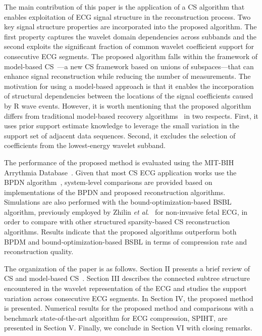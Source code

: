 \documentclass[journal]{IEEEtran}
\begin{document}
The main contribution of this paper is the application of a  CS algorithm that enables exploitation of ECG signal structure in the reconstruction process. Two key signal structure properties are incorporated into the proposed algorithm. The first property captures the wavelet domain dependencies across subbands and the second exploits the significant fraction of common wavelet coefficient support for consecutive ECG segments. The proposed algorithm falls within the framework of model-based CS~\cite{Bara10}---a new CS framework based on unions of subspaces---that can enhance signal reconstruction while reducing the number of measurements. The motivation for using a model-based approach is that it enables the incorporation of structural dependencies between the locations of the signal coefficients caused by R wave events. However, it is worth mentioning that the proposed algorithm differs from traditional model-based recovery algorithms~\cite{Bara10, Mama11a} in two respects. First, it uses prior support estimate knowledge to leverage the small variation in the support set of adjacent data sequences. Second, it excludes the selection of coefficients from the lowest-energy wavelet subband.

The performance of the proposed method is evaluated using the MIT-BIH Arrythmia Database~\cite{Gold00}. Given that most CS ECG application works use the BPDN algorithm~\cite{Mama11,Dixo12}, system-level comparisons are provided based on implementations of the BPDN and proposed reconstruction algorithms. Simulations are also performed with the bound-optimization-based BSBL algorithm, previously employed by Zhilin \textit{et al}.~\cite{Zhan13} for non-invasive fetal ECG, in order to compare with other structured sparsity-based CS reconstruction algorithms. Results indicate that the proposed algorithms outperform both BPDM and bound-optimization-based BSBL in terms of compression rate and reconstruction quality.

The organization of the paper is as follows. Section II presents a brief review of CS and model-based CS~\cite{Bara10}. Section III describes the connected subtree structure encountered in the wavelet representation of the ECG and studies the support variation across consecutive ECG segments. In Section IV, the proposed method is presented. Numerical results for the proposed method and comparisons with a benchmark state-of-the-art algorithm for ECG compression, SPIHT, are presented in Section V. Finally, we conclude in Section VI with closing remarks.
\end{document}
